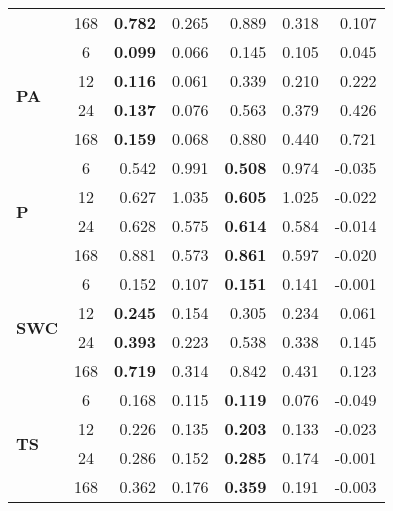 \begin{table}
\begin{tabular}{p{2.1cm}c|rr|rr|r}
 & 168 & \bfseries 0.782 & 0.265 & 0.889 & 0.318 & 0.107 \\
\cline{1-7}
\multirow[c]{4}{*}{\parbox{2.1cm}{\textbf{PA}}} & 6 & \bfseries 0.099 & 0.066 & 0.145 & 0.105 & 0.045 \\
 & 12 & \bfseries 0.116 & 0.061 & 0.339 & 0.210 & 0.222 \\
 & 24 & \bfseries 0.137 & 0.076 & 0.563 & 0.379 & 0.426 \\
 & 168 & \bfseries 0.159 & 0.068 & 0.880 & 0.440 & 0.721 \\
\cline{1-7}
\multirow[c]{4}{*}{\parbox{2.1cm}{\textbf{P}}} & 6 & 0.542 & 0.991 & \bfseries 0.508 & 0.974 & -0.035 \\
 & 12 & 0.627 & 1.035 & \bfseries 0.605 & 1.025 & -0.022 \\
 & 24 & 0.628 & 0.575 & \bfseries 0.614 & 0.584 & -0.014 \\
 & 168 & 0.881 & 0.573 & \bfseries 0.861 & 0.597 & -0.020 \\
\cline{1-7}
\multirow[c]{4}{*}{\parbox{2.1cm}{\textbf{SWC}}} & 6 & 0.152 & 0.107 & \bfseries 0.151 & 0.141 & -0.001 \\
 & 12 & \bfseries 0.245 & 0.154 & 0.305 & 0.234 & 0.061 \\
 & 24 & \bfseries 0.393 & 0.223 & 0.538 & 0.338 & 0.145 \\
 & 168 & \bfseries 0.719 & 0.314 & 0.842 & 0.431 & 0.123 \\
\cline{1-7}
\multirow[c]{4}{*}{\parbox{2.1cm}{\textbf{TS}}} & 6 & 0.168 & 0.115 & \bfseries 0.119 & 0.076 & -0.049 \\
 & 12 & 0.226 & 0.135 & \bfseries 0.203 & 0.133 & -0.023 \\
 & 24 & 0.286 & 0.152 & \bfseries 0.285 & 0.174 & -0.001 \\
 & 168 & 0.362 & 0.176 & \bfseries 0.359 & 0.191 & -0.003 \\
\cline{1-7}
\bottomrule
\end{tabular}
\end{table}
